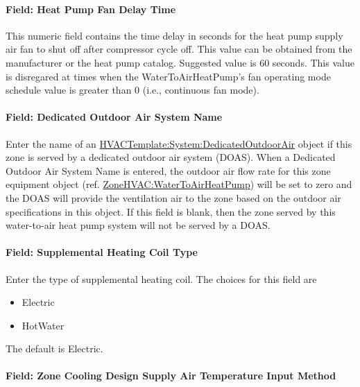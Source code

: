 \paragraph{Field: Heat Pump Fan Delay Time}\label{field-heat-pump-fan-delay-time}

This numeric field contains the time delay in seconds for the heat pump supply air fan to shut off after compressor cycle off. This value can be obtained from the manufacturer or the heat pump catalog. Suggested value is 60 seconds. This value is disregared at times when the WaterToAirHeatPump's fan operating mode schedule value is greater than 0 (i.e., continuous fan mode).

\paragraph{Field: Dedicated Outdoor Air System Name}\label{field-dedicated-outdoor-air-system-name-4}

Enter the name of an \hyperref[hvactemplatesystemdedicatedoutdoorair]{HVACTemplate:System:DedicatedOutdoorAir} object if this zone is served by a dedicated outdoor air system (DOAS). When a Dedicated Outdoor Air System Name is entered, the outdoor air flow rate for this zone equipment object (ref. \hyperref[zonehvacwatertoairheatpump]{ZoneHVAC:WaterToAirHeatPump}) will be set to zero and the DOAS will provide the ventilation air to the zone based on the outdoor air specifications in this object. If this field is blank, then the zone served by this water-to-air heat pump system will not be served by a DOAS.

\paragraph{Field: Supplemental Heating Coil Type}\label{field-supplemental-heating-coil-type-1}

Enter the type of supplemental heating coil. The choices for this field are

\begin{itemize}
\item
  Electric
\item
  HotWater
\end{itemize}

The default is Electric.

\paragraph{Field: Zone Cooling Design Supply Air Temperature Input Method}\label{field-zone-cooling-design-supply-air-temperature-input-method-3}

